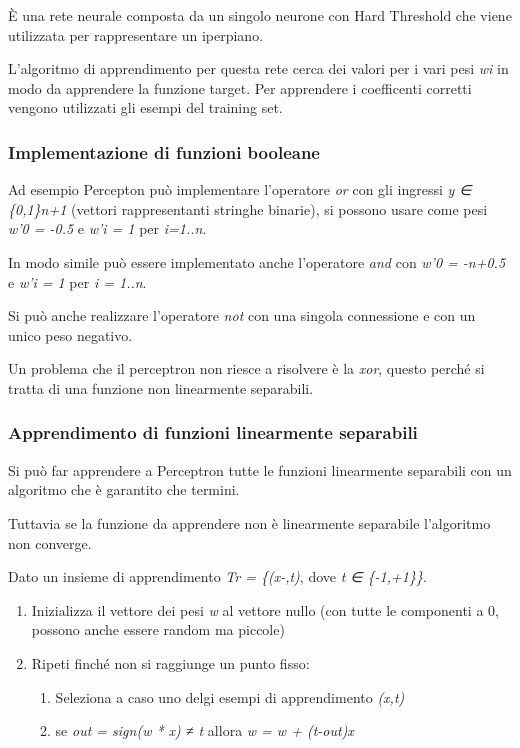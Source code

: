 È una rete neurale composta da un singolo neurone con Hard Threshold che
viene utilizzata per rappresentare un iperpiano.

L'algoritmo di apprendimento per questa rete cerca dei valori per i vari
pesi \emph{wi} in modo da apprendere la funzione target. Per apprendere
i coefficenti corretti vengono utilizzati gli esempi del training set.

\subsubsection{Implementazione di funzioni
booleane}\label{implementazione-di-funzioni-booleane}

Ad esempio Percepton può implementare l'operatore \emph{or} con gli
ingressi \emph{y ∈ \{0,1\}n+1} (vettori rappresentanti stringhe
binarie), si possono usare come pesi \emph{w'0 = -0.5} e \emph{w'i = 1}
per \emph{i=1..n}.

In modo simile può essere implementato anche l'operatore \emph{and} con
\emph{w'0 = -n+0.5} e \emph{w'i = 1} per \emph{i = 1..n}.

Si può anche realizzare l'operatore \emph{not} con una singola
connessione e con un unico peso negativo.

Un problema che il perceptron non riesce a risolvere è la \emph{xor},
questo perché si tratta di una funzione non linearmente separabili.

\subsubsection{Apprendimento di funzioni linearmente
separabili}\label{apprendimento-di-funzioni-linearmente-separabili}

Si può far apprendere a Perceptron tutte le funzioni linearmente
separabili con un algoritmo che è garantito che termini.

Tuttavia se la funzione da apprendere non è linearmente separabile
l'algoritmo non converge.

Dato un insieme di apprendimento \emph{Tr = \{(x-,t)}, dove \emph{t ∈
\{-1,+1\}\}}.

\begin{enumerate}
\item
  Inizializza il vettore dei pesi \emph{w} al vettore nullo (con tutte
  le componenti a 0, possono anche essere random ma piccole)
\item
  Ripeti finché non si raggiunge un punto fisso:

  \begin{enumerate}
  \item
    Seleziona a caso uno delgi esempi di apprendimento \emph{(x,t)}
  \item
    se \emph{out = sign(w * x) ≠ t} allora \emph{w = w + (t-out)x}
  \end{enumerate}
\end{enumerate}

